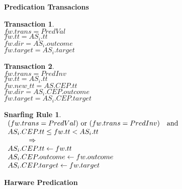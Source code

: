 \documentclass[12pt]{slides}
\newtheorem{trans}{Transaction}
\newtheorem{snarf}{Snarfing Rule}
\begin{document}
\begin{slide}
\begin{center}
\textbf {Predication Transacions}
\end{center}
%
%

\begin{trans}
\mbox{} \\
\indent $fw.trans = PredVal $ \\
\indent $fw.tt = AS_i.tt$ \\
\indent $fw.dir = AS_i.outcome $ \\
\indent $fw.target = AS_i.target $
\end{trans}

\begin{trans}
 \mbox{} \\
 \indent $fw.trans = PredInv$ \\
 \indent $fw.tt = AS_i.tt$ \\
 \indent $fw.new\_tt = AS.CEP.tt $ \\
 \indent $fw.dir = AS_i.CEP.outcome $ \\
 \indent $fw.target = AS_i.CEP.target $
\end{trans}

\begin{snarf}
\label{snar:predval}
\mbox{} \\
\(
\begin{array}{ll}
(fw.trans = PredVal) \ \textup{or} \ (fw.trans = PredInv) & \textup{and} \\
AS_i.CEP.tt \leq fw.tt < AS_i.tt \\
\hspace{3em} \Rightarrow \\
AS_i.CEP.tt \leftarrow fw.tt\\
AS_i.CEP.outcome \leftarrow fw.outcome\\
AS_i.CEP.target \leftarrow fw.target
\end{array}
\)
\end{snarf}

\end{slide}



\begin{slide}
\begin{center}
\textbf {Harware Predication}
\end{center}
%

{}

\end{slide}
\end{document}
